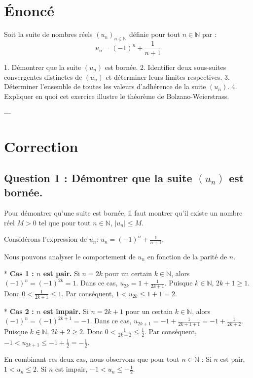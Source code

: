 \documentclass{report}
\begin{document}
\newpage


\section*{Énoncé}

Soit la suite de nombres réels $(u_n)_{n \in \mathbb{N}}$ définie pour tout $n \in \mathbb{N}$ par :
$$u_n = (-1)^n + \frac{1}{n+1}$$

1.  Démontrer que la suite $(u_n)$ est bornée.
2.  Identifier deux sous-suites convergentes distinctes de $(u_n)$ et déterminer leurs limites respectives.
3.  Déterminer l'ensemble de toutes les valeurs d'adhérence de la suite $(u_n)$.
4.  Expliquer en quoi cet exercice illustre le théorème de Bolzano-Weierstrass.

---

\section*{Correction}

\subsection*{Question 1 : Démontrer que la suite $(u_n)$ est bornée.}

Pour démontrer qu'une suite est bornée, il faut montrer qu'il existe un nombre réel $M > 0$ tel que pour tout $n \in \mathbb{N}$, $|u_n| \le M$.

Considérons l'expression de $u_n$: $u_n = (-1)^n + \frac{1}{n+1}$.

Nous pouvons analyser le comportement de $u_n$ en fonction de la parité de $n$.

*   \textbf{Cas 1 : $n$ est pair.}
    Si $n = 2k$ pour un certain $k \in \mathbb{N}$, alors $(-1)^n = (-1)^{2k} = 1$.
    Dans ce cas, $u_{2k} = 1 + \frac{1}{2k+1}$.
    Puisque $k \in \mathbb{N}$, $2k+1 \ge 1$. Donc $0 < \frac{1}{2k+1} \le 1$.
    Par conséquent, $1 < u_{2k} \le 1+1 = 2$.

*   \textbf{Cas 2 : $n$ est impair.}
    Si $n = 2k+1$ pour un certain $k \in \mathbb{N}$, alors $(-1)^n = (-1)^{2k+1} = -1$.
    Dans ce cas, $u_{2k+1} = -1 + \frac{1}{2k+1+1} = -1 + \frac{1}{2k+2}$.
    Puisque $k \in \mathbb{N}$, $2k+2 \ge 2$. Donc $0 < \frac{1}{2k+2} \le \frac{1}{2}$.
    Par conséquent, $-1 < u_{2k+1} \le -1 + \frac{1}{2} = -\frac{1}{2}$.

En combinant ces deux cas, nous observons que pour tout $n \in \mathbb{N}$ :
Si $n$ est pair, $1 < u_n \le 2$.
Si $n$ est impair, $-1 < u_n \le -\frac{1}{2}$.
\end{document}
